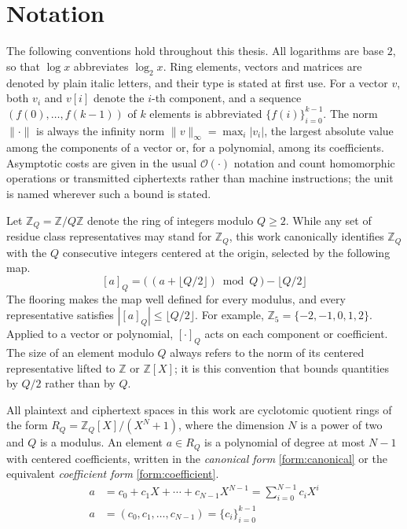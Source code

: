 \section{Notation}
\label{sec:notation}

The following conventions hold throughout this thesis. All logarithms are base $2$, so that $\log x$ abbreviates $\log_2 x$. Ring elements, vectors and matrices are denoted by plain italic letters, and their type is stated at first use. For a vector $v$, both $v_i$ and $v[i]$ denote the $i$-th component, and a sequence $(f(0), \dots, f(k-1))$ of $k$ elements is abbreviated $\{f(i)\}_{i=0}^{k-1}$. The norm $\|\cdot\|$ is always the infinity norm $\|v\|_\infty = \max_i |v_i|$, the largest absolute value among the components of a vector or, for a polynomial, among its coefficients. Asymptotic costs are given in the usual $\mathcal{O}(\cdot)$ notation and count homomorphic operations or transmitted ciphertexts rather than machine instructions; the unit is named wherever such a bound is stated.

\begin{definition}
    \label{def:centered}
    Let $\mathbb{Z}_Q = \mathbb{Z}/Q\mathbb{Z}$ denote the ring of integers modulo $Q \geq 2$. While any set of residue class representatives may stand for $\mathbb{Z}_Q$, this work canonically identifies $\mathbb{Z}_Q$ with the $Q$ consecutive integers centered at the origin, selected by the following map.
    \begin{equation}
        \label{eq:centered}
        [a]_Q = \big(\, (a + \lfloor Q/2 \rfloor) \bmod Q \,\big) - \lfloor Q/2 \rfloor
    \end{equation}
    The flooring makes the map well defined for every modulus, and every representative satisfies $|[a]_Q| \leq \lfloor Q/2 \rfloor$. For example, $\mathbb{Z}_5 = \{-2, -1, 0, 1, 2\}$. Applied to a vector or polynomial, $[\cdot]_Q$ acts on each component or coefficient. The size of an element modulo $Q$ always refers to the norm of its centered representative lifted to $\mathbb{Z}$ or $\mathbb{Z}[X]$; it is this convention that bounds quantities by $Q/2$ rather than by $Q$.
\end{definition}

\begin{definition}
    \label{def:ring}
    All plaintext and ciphertext spaces in this work are cyclotomic quotient rings of the form $R_Q = \mathbb{Z}_Q[X]/(X^N + 1)$, where the dimension $N$ is a power of two and $Q$ is a modulus. An element $a \in R_Q$ is a polynomial of degree at most $N - 1$ with centered coefficients, written in the \emph{canonical form} \eqref{form:canonical} or the equivalent \emph{coefficient form} \eqref{form:coefficient}.
    \begin{align}
        \label{form:canonical}
        a &= c_0 + c_1X + \cdots + c_{N-1}X^{N-1} = \sum_{i=0}^{N-1} c_iX^i \\
        \label{form:coefficient}
        a &= (c_0, c_1, \dots, c_{N-1}) = \{c_i\}_{i=0}^{k-1}
    \end{align}
\end{definition}
